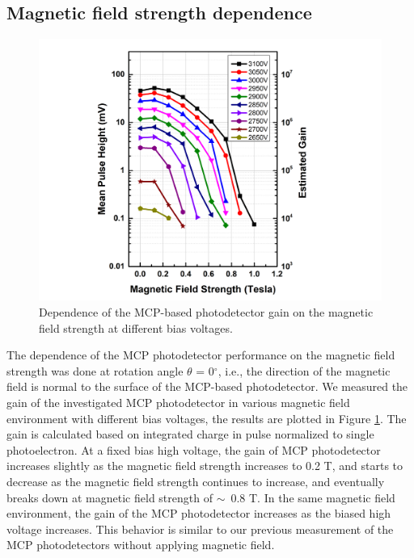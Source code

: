 \documentclass[preprint,5p]{elsarticle}
\begin{document}
\subsection{Magnetic field strength dependence}\label{subsec_HV}
\begin{figure}[tbp]
\hspace{-1.0 cm} 
\includegraphics[scale=0.1]{fig/MCPs_gain_B_HV.png}
\caption{Dependence of the MCP-based photodetector gain on the magnetic field 
strength at different bias voltages.} \label{fig:MCPs_gain_B_HV}
\end{figure}

The dependence of the MCP photodetector performance on the magnetic field 
strength was done at rotation angle $\theta$ = 0$^{\circ}$, i.e., the direction 
of the magnetic field is normal to the surface of the MCP-based photodetector.  
We measured the gain of the investigated MCP photodetector in various magnetic 
field environment with different bias voltages, the results are plotted in 
Figure \ref{fig:MCPs_gain_B_HV}. The gain is calculated based on integrated 
charge in pulse normalized to single photoelectron. At a fixed bias high 
voltage, the gain of MCP photodetector increases slightly as the magnetic field 
strength increases to 0.2 T, and starts to decrease as the magnetic field 
strength continues to increase, and eventually breaks down at magnetic field 
strength of $\sim$~0.8 T.  In the same magnetic field environment, the gain of 
the MCP photodetector increases as the biased high voltage increases.  This 
behavior is similar to our previous measurement of the MCP photodetectors 
without applying magnetic field. 
\end{document}
